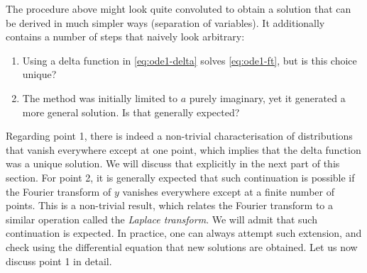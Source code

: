 The procedure above might look quite convoluted to obtain a solution that can be derived
in much simpler ways (\eg separation of variables). It additionally contains a number of
steps that naively look arbitrary:
\begin{enumerate}
  \item Using a delta function in \cref{eq:ode1-delta} solves \cref{eq:ode1-ft}, but is
    this choice unique?
  \item The method was initially limited to $a$ purely imaginary, yet it generated a more
    general solution. Is that generally expected?
\end{enumerate}
Regarding point 1, there is indeed a non-trivial characterisation of distributions that
vanish everywhere except at one point, which implies that the delta function was a unique
solution. We will discuss that explicitly in the next part of this section. For point 2,
it is generally expected that such continuation is possible if the Fourier transform of
$y$ vanishes everywhere except at a finite number of points. This is a non-trivial result,
which relates the Fourier transform to a similar operation called the \emph{Laplace
transform}. We will admit that such continuation is expected. In practice, one can always
attempt such extension, and check using the differential equation that new solutions are
obtained. Let us now discuss point 1 in detail.
